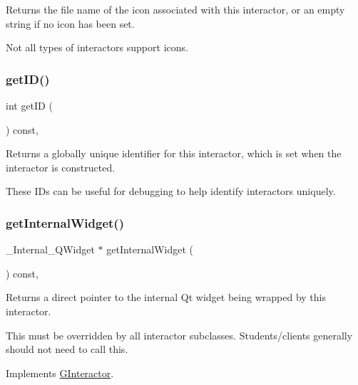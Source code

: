 Returns the file name of the icon associated with this interactor, or an empty string if no icon has been set. 

Not all types of interactors support icons. \mbox{\label{classsgl_1_1GInteractor_a9c9659a6c6ba66b4107ba59c95a24241}} 
\subsubsection{\texorpdfstring{get\+I\+D()}{getID()}}
{\footnotesize\ttfamily int get\+ID (\begin{DoxyParamCaption}{ }\end{DoxyParamCaption}) const\hspace{0.3cm}{\ttfamily [virtual]}, {\ttfamily [inherited]}}



Returns a globally unique identifier for this interactor, which is set when the interactor is constructed. 

These I\+Ds can be useful for debugging to help identify interactors uniquely. \mbox{\label{classsgl_1_1GRadioButton_a2f6b36b2517087dc90a366b5ce1f5323}} 
\subsubsection{\texorpdfstring{get\+Internal\+Widget()}{getInternalWidget()}}
{\footnotesize\ttfamily \+\_\+\+Internal\+\_\+\+Q\+Widget $\ast$ get\+Internal\+Widget (\begin{DoxyParamCaption}{ }\end{DoxyParamCaption}) const\hspace{0.3cm}{\ttfamily [override]}, {\ttfamily [virtual]}}



Returns a direct pointer to the internal Qt widget being wrapped by this interactor. 

This must be overridden by all interactor subclasses. Students/clients generally should not need to call this. 

Implements \mbox{\hyperlink{classsgl_1_1GInteractor}{G\+Interactor}}.

